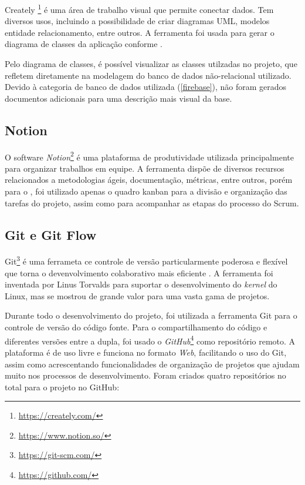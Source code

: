 Creately \footnote{\url{https://creately.com/}} é uma área de trabalho visual que permite conectar dados. Tem diversos usos, incluindo a possibilidade de criar diagramas UML, modelos entidade relacionamento, entre outros. A ferramenta foi usada para gerar o diagrama de classes da aplicação conforme .


Pelo diagrama de classes, é possível visualizar as classes utilzadas no projeto, que refletem diretamente na modelagem do banco de dados não-relacional utilizado. Devido à categoria de banco de dados utilizada (\ref{firebase}), não foram gerados documentos adicionais para uma descrição mais visual da base.

\subsection{Notion}

O software \textit{Notion}\footnote{\url{https://www.notion.so/}} é uma plataforma de produtividade utilizada principalmente para organizar trabalhos em equipe. A ferramenta dispõe de diversos recursos relacionados a metodologias ágeis, documentação, métricas, entre outros, porém para o \appName, foi utilizado apenas o quadro kanban para a divisão e organização das tarefas do projeto, assim como para acompanhar as etapas do processo do Scrum.

\subsection{Git e Git Flow}
\label{git}

Git\footnote{\url{https://git-scm.com/}} é uma ferrameta ce controle de versão particularmente poderosa e flexível que torna o devenvolvimento colaborativo mais eficiente \cite{git}. A ferramenta foi inventada por Linus Torvalds para suportar o desenvolvimento do \textit{kernel} do Linux, mas se mostrou de grande valor para uma vasta gama de projetos.

Durante todo o desenvolvimento do projeto, foi utilizada a ferramenta Git para o controle de versão do código fonte. Para o compartilhamento do código e diferentes versões entre a dupla, foi usado o \textit{GitHub}\footnote{\url{https://github.com/}} como repositório remoto. A plataforma é de uso livre e funciona no formato \textit{Web}, facilitando o uso do Git, assim como acrescentando funcionalidades de organização de projetos que ajudam muito nos processos de desenvolvimento. Foram criados quatro repositórios no total para o projeto no GitHub:

